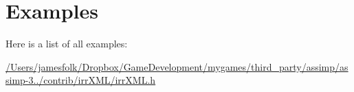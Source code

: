 \section{Examples}
Here is a list of all examples\+:\begin{DoxyCompactItemize}
\item 
\hyperlink{_2_users_2jamesfolk_2_dropbox_2_game_development_2mygames_2third_party_2assimp_2assimp-3_81_81_2b1dcc9df1e93e2ac9c863740ad4632a8}{/\+Users/jamesfolk/\+Dropbox/\+Game\+Development/mygames/third\+\_\+party/assimp/assimp-\/3../contrib/irr\+X\+M\+L/irr\+X\+M\+L.\+h}
\end{DoxyCompactItemize}
